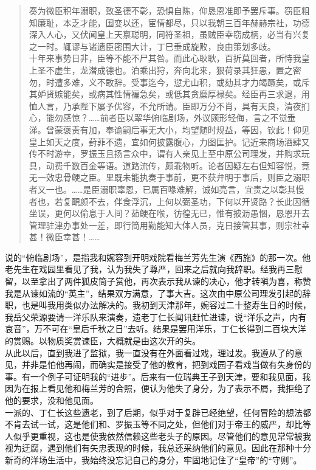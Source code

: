 \begin{quote}
	奏为微臣积年溺职，致圣德不彰，恐惧自陈，仰恳恩准即予罢斥事。窃臣粗知廉耻，本乏才能，国变以还，宦情都尽，只以我朝三百年赫赫宗社，功德深入人心，又伏闻皇上天禀聪明，同符圣祖，虽贼臣幸窃成柄，必当有兴复之一时。辄谬与诸遗臣密围大计，丁巳垂成旋败，良由策划多歧。\\

十年来事势日非，臣等不能不尸其咎。而此心耿耿，百折莫回者，所恃我皇上圣不虚生，龙潜成德也。泊乘出狩，奔向北来，狠荷录其狂愚，置之密勿，时遭多难，义不敢辞。受事迄今，愆尤山积，或劾其才力竭蹶矣，或斥其妒贤嫉能矣，或病其性情褊急矣，或低其贪糜厚禄矣。经臣再三求退，用恤人言，乃承陛下屡予优容，不允所请。臣即万分不肖，具有天良，清夜扪心，能勿感惊？……前者臣以翠华俯临剧场，外议颇形轻侮，言之不觉垂涕。曾蒙褒责有加，奉谕嗣后事无大小，均望随时规益，等因，钦此！仰见皇上如天之度，葑菲不遗，宜如何披露腹心，力图匡护。记近来商场酒肆又传不时游幸，罗振玉且扬言众中，谓有人亲见上至中原公司理发，并购求玩具，动费千数百金等语。道路流传，颇乖物听。论者因疑左右但知容悦，竟无一效忠骨鲠之臣。里既未能执奏于事前，更不获弁明于事后，则臣之溺职者又一也。……是臣溺职辜恩，已属百喙难解，诚如亮言，宜责之以彰其慢者也，若复靦颜不去，伴食浮沉，上何以弼圣功，下何以开贤路？长此因循坐误，更何以偷息于人间？茹鲠在喉，彷徨无已，惟有披沥愚悃，恳恩开去管理驻津办事处一差，即行简用勤能知大体人员，克日接管其事，则宗社幸甚！微臣幸甚！……\\
\end{quote}

说的“俯临剧场”，是指我和婉容到开明戏院看梅兰芳先生演《西施》的那一次。他老先生在戏园里看见了我，认为我失了尊严，回来之后就向我辞职。经我再三慰留，以至拿出了两件狐皮筒子赏他，再次表示我从谏的决心，他才转嗔为喜，称赞我是从谏如流的“英主”，结果双方满意，了事大吉。这次由中原公司理发引起的辞职，也是叫我用类似办法解决的。我初到天津那年，婉容过二十整寿生日的时候，我岳父荣源要请一洋乐队来演奏，遗老丁仁长闻讯赶忙进谏，说“洋乐之声，内有哀音”，万不可在“皇后千秋之日”去听。结果是罢用洋乐，丁仁长得到二百块大洋的赏赐。以物质奖赏谏臣，大概就是由这次开的头。\\

从此以后，直到我进了监狱，我一直没有在外面看过戏，理过发。我遵从了的意见，并非是怕他再闹，而确实是接受了他的教育，把到戏园子看戏当做有失身份的事。有一个例子可证明我的“进步”。后来有一位瑞典王子到天津，要和我见面，我因为在报上看见他和梅兰芳的合照，便认为他失了身分，为了表示不屑，我拒绝了他的要求，没和他见面。\\

一派的、丁仁长这些遗老，到了后期，似乎对于复辟已经绝望，任何冒险的想法都不肯去试一试，这是他们和、罗振玉等不同之处，但他们对于帝王的威严，却比等人似乎更重视，这也是使我依然信赖这些老头子的原因。尽管他们的意见常常被我视为迂腐，遇到他们有矢忠表现的时候，我总还采纳他们的意见。因此在那种十分新奇的洋场生活中，我始终没忘记自己的身分，牢固地记住了“皇帝”的“守则”。\\

